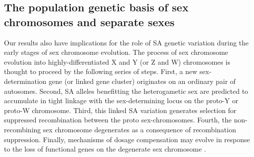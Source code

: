\documentclass{article}
\begin{document}
\subsection*{The population genetic basis of sex chromosomes and separate sexes}

Our results also have implications for the role of SA genetic variation during the early stages of sex chromosome evolution. The process of sex chromosome evolution into highly-differentiated X and Y (or Z and W) chromosomes is thought to proceed by the following series of steps. First, a new sex-determination gene (or linked gene cluster) originates on an ordinary pair of autosomes. Second, SA alleles benefitting the heterogametic sex are predicted to accumulate in tight linkage with the sex-determining locus on the proto-Y or proto-W chromosome. Third, this linked SA variation generates selection for suppressed recombination between the proto sex-chromosomes. Fourth, the non-recombining sex chromosome degenerates as a consequence of recombination suppression. Finally, mechanisms of dosage compensation may evolve in response to the loss of functional genes on the degenerate sex chromosome \citep{Rice1987, Charlesworth2002, CharlesworthEtAl2005, Bachtrog2006, Qiuetal2013, Bachtrog2014}. 
\end{document}
